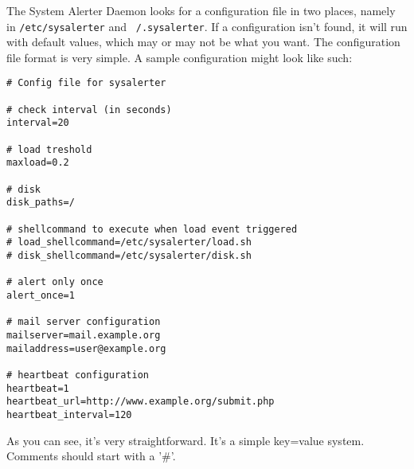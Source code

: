 \documentclass[a4paper,10pt,titlepage]{book}
\begin{document}
The System Alerter Daemon looks for a configuration file in two places, namely in \texttt{/etc/sysalerter} and \texttt{~/.sysalerter}. If a configuration isn't found, it will run with default values, which may or may not be what you want. The configuration file format is very simple. A sample configuration might look like such:

\begin{lstlisting}
# Config file for sysalerter

# check interval (in seconds)
interval=20

# load treshold 
maxload=0.2

# disk
disk_paths=/

# shellcommand to execute when load event triggered
# load_shellcommand=/etc/sysalerter/load.sh
# disk_shellcommand=/etc/sysalerter/disk.sh

# alert only once
alert_once=1

# mail server configuration
mailserver=mail.example.org
mailaddress=user@example.org

# heartbeat configuration
heartbeat=1
heartbeat_url=http://www.example.org/submit.php
heartbeat_interval=120
\end{lstlisting}

As you can see, it's very straightforward. It's a simple key=value system. Comments should start with a '#'. 
\end{document}
